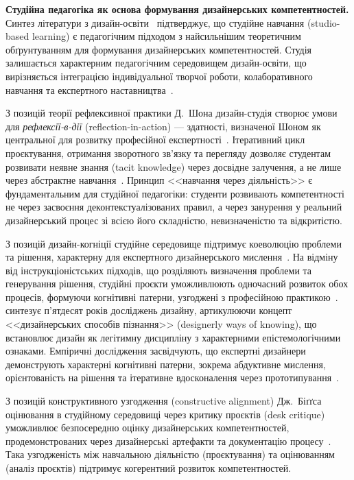 \textbf{Студійна педагогіка як основа формування дизайнерських компетентностей.} Синтез літератури з дизайн-освіти~\cite{Musiienko2025DesignEducation} підтверджує, що студійне навчання (studio-based learning) є педагогічним підходом з найсильнішим теоретичним обґрунтуванням для формування дизайнерських компетентностей. Студія залишається характерним педагогічним середовищем дизайн-освіти, що вирізняється інтеграцією індивідуальної творчої роботи, колаборативного навчання та експертного наставництва~\cite{Goldschmidt2010285}.

З позицій теорії рефлексивної практики Д.~Шона дизайн-студія створює умови для \emph{рефлексії-в-дії} (reflection-in-action) --- здатності, визначеної Шоном як центральної для розвитку професійної експертності~\cite{Schon1983}. Ітеративний цикл проєктування, отримання зворотного зв'язку та перегляду дозволяє студентам розвивати неявне знання (tacit knowledge) через досвідне залучення, а не лише через абстрактне навчання~\cite{Mewburn2012363}. Принцип <<навчання через діяльність>> є фундаментальним для студійної педагогіки: студенти розвивають компетентності не через засвоєння деконтекстуалізованих правил, а через занурення у реальний дизайнерський процес зі всією його складністю, невизначеністю та відкритістю.

З позицій дизайн-когніції студійне середовище підтримує коеволюцію проблеми та рішення, характерну для експертного дизайнерського мислення~\cite{Cross2011}. На відміну від інструкціоністських підходів, що розділяють визначення проблеми та генерування рішення, студійні проєкти уможливлюють одночасний розвиток обох процесів, формуючи когнітивні патерни, узгоджені з професійною практикою~\cite{Lawson2005}. \citet{Cross2018691} синтезує п'ятдесят років досліджень дизайну, артикулюючи концепт <<дизайнерських способів пізнання>> (designerly ways of knowing), що встановлює дизайн як легітимну дисципліну з характерними епістемологічними ознаками. Емпіричні дослідження засвідчують, що експертні дизайнери демонструють характерні когнітивні патерни, зокрема абдуктивне мислення, орієнтованість на рішення та ітеративне вдосконалення через прототипування~\cite{Kokotovich200849, Atman2019125}.

З позицій конструктивного узгодження (constructive alignment) Дж.~Біґґса оцінювання в студійному середовищі через критику проєктів (desk critique) уможливлює безпосередню оцінку дизайнерських компетентностей, продемонстрованих через дизайнерські артефакти та документацію процесу~\cite{Biggs1996}. Така узгодженість між навчальною діяльністю (проєктування) та оцінюванням (аналіз проєктів) підтримує когерентний розвиток компетентностей.

